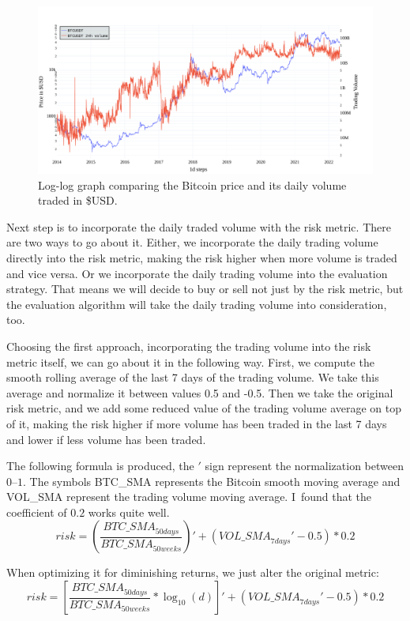 \begin{figure}[!hbt]
    \centering
    \includegraphics[width=\columnwidth]{figures/24volume-log.pdf}
    \caption{Log-log graph comparing the Bitcoin price and its daily volume traded in \$USD.}
    \label{figure-24volume-log}
\end{figure}

Next step is to incorporate the daily traded volume with the risk metric. There are two ways to go about it. Either, we incorporate the daily trading volume directly into the risk metric, making the risk higher when more volume is traded and vice versa. Or we incorporate the daily trading volume into the evaluation strategy. That means we will decide to buy or sell not just by the risk metric, but the evaluation algorithm will take the daily trading volume into consideration, too.

Choosing the first approach, incorporating the trading volume into the risk metric itself, we can go about it in the following way. First, we compute the smooth rolling average of the last 7 days of the trading volume. We take this average and normalize it between values 0.5 and -0.5. Then we take the original risk metric, and we add some reduced value of the trading volume average on top of it, making the risk higher if more volume has been traded in the last 7 days and lower if less volume has been traded.

The following formula is produced, the $'$ sign represent the normalization between $0$--$1$. The symbols BTC\_SMA represents the Bitcoin smooth moving average and VOL\_SMA represent the trading volume moving average. I~found that the coefficient of $0.2$ works quite well.
$$risk = \left(\frac{\mathit{BTC\_SMA}_{50 days}}{\mathit{BTC\_SMA}_{50 weeks}}\right)' + \left(\mathit{VOL\_SMA}_{7 days}' - 0.5\right) * 0.2$$

When optimizing it for diminishing returns, we just alter the original metric:
$$risk = \left[\frac{\mathit{BTC\_SMA}_{50 days}}{\mathit{BTC\_SMA}_{50 weeks}} * \log_{10}(d)\right]' + \left(\mathit{VOL\_SMA}_{7 days}' - 0.5\right) * 0.2$$

